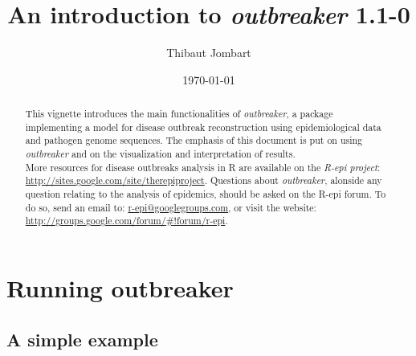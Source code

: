 \documentclass{article}\usepackage[]{graphicx}\usepackage[]{color}
\title{An introduction to \textit{outbreaker} 1.1-0}
\author{Thibaut Jombart}
\date{\today}
\begin{document}
\color{black}

\maketitle

\begin{abstract}
  This vignette introduces the main functionalities of \textit{outbreaker}, a package implementing a
  model for disease outbreak reconstruction using epidemiological data and pathogen genome
  sequences. The emphasis of this document is put on using \textit{outbreaker} and on the
  visualization and interpretation of results.
  \\

  More resources for disease outbreaks analysis in R are available on the \textit{R-epi project}:
  \url{http://sites.google.com/site/therepiproject}. Questions about \textit{outbreaker}, alonside
  any question relating to the analysis of epidemics, should be asked on the R-epi forum. To do so, send an
  email to: \url{r-epi@googlegroups.com}, or visit the website:
  \url{http://groups.google.com/forum/#!forum/r-epi}.
\end{abstract}


\tableofcontents
\newpage





\section{Running outbreaker}


\subsection{A simple example}
\end{document}
